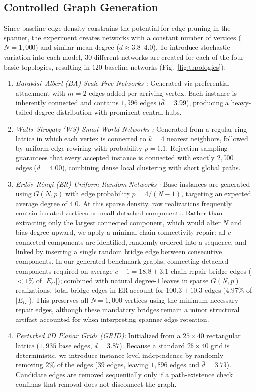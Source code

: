 \documentclass[conference]{IEEEtran}
\begin{document}
\subsection{Controlled Graph Generation}
Since baseline edge density constrains the potential for edge pruning in the spanner, the experiment creates networks with a constant number of vertices ($N = 1,000$) and similar mean degree ($\bar{d} \approx 3.8\text{--}4.0$). To introduce stochastic variation into each model, $30$ different networks are created for each of the four basic topologies, resulting in $120$ baseline networks (Fig.~\ref{fig:topologies}):
\begin{enumerate}
    \item \textit{Barab\'{a}si--Albert (BA) Scale-Free Networks \cite{ref13}:} Generated via preferential attachment with $m = 2$ edges added per arriving vertex. Each instance is inherently connected and contains $1,996$ edges ($\bar{d} = 3.99$), producing a heavy-tailed degree distribution with prominent central hubs.
    \item \textit{Watts--Strogatz (WS) Small-World Networks \cite{ref14}:} Generated from a regular ring lattice in which each vertex is connected to $k = 4$ nearest neighbors, followed by uniform edge rewiring with probability $p = 0.1$. Rejection sampling guarantees that every accepted instance is connected with exactly $2,000$ edges ($\bar{d} = 4.00$), combining dense local clustering with short global paths.
    \item \textit{Erd\H{o}s--R\'{e}nyi (ER) Uniform Random Networks \cite{ref15}:} Base instances are generated using $G(N, p)$ with edge probability $p = 4/(N - 1)$, targeting an expected average degree of $4.0$. At this sparse density, raw realizations frequently contain isolated vertices or small detached components. Rather than extracting only the largest connected component, which would alter $N$ and bias degree upward, we apply a minimal chain connectivity repair: all $c$ connected components are identified, randomly ordered into a sequence, and linked by inserting a single random bridge edge between consecutive components. In our generated benchmark graphs, connecting detached components required on average $c - 1 = 18.8 \pm 3.1$ chain-repair bridge edges ($< 1\%$ of $|E_G|$); combined with natural degree-$1$ leaves in sparse $G(N, p)$ realizations, total bridge edges in ER account for $100.3 \pm 10.3$ edges ($4.97\%$ of $|E_G|$). This preserves all $N = 1,000$ vertices using the minimum necessary repair edges, although these mandatory bridges remain a minor structural artifact accounted for when interpreting spanner edge retention.
    \item \textit{Perturbed 2D Planar Grids (GRID):} Initialized from a $25 \times 40$ rectangular lattice ($1,935$ base edges, $\bar{d} = 3.87$). Because a standard $25 \times 40$ grid is deterministic, we introduce instance-level independence by randomly removing $2\%$ of the edges ($39$ edges, leaving $1,896$ edges and $\bar{d} = 3.79$). Candidate edges are removed sequentially only if a path-existence check confirms that removal does not disconnect the graph.
\end{enumerate}
\end{document}
